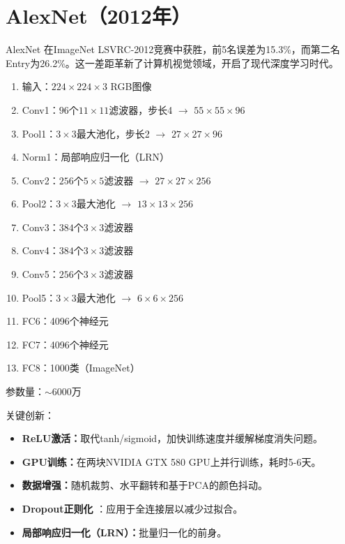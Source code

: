 \section{AlexNet（2012年）}

AlexNet \cite{krizhevsky2012imagenet}在ImageNet LSVRC-2012竞赛中获胜，前5名误差为15.3\%，而第二名 Entry为26.2\%。这一差距革新了计算机视觉领域，开启了现代深度学习时代。

\begin{architecture}[AlexNet架构]
\begin{enumerate}
    \item 输入：$224\times224\times3$ RGB图像
    \item Conv1：$96$个$11\times11$滤波器，步长4 $\rightarrow$ $55\times55\times96$
    \item Pool1：$3\times3$最大池化，步长2 $\rightarrow$ $27\times27\times96$
    \item Norm1：局部响应归一化（LRN）
    \item Conv2：$256$个$5\times5$滤波器 $\rightarrow$ $27\times27\times256$
    \item Pool2：$3\times3$最大池化 $\rightarrow$ $13\times13\times256$
    \item Conv3：$384$个$3\times3$滤波器
    \item Conv4：$384$个$3\times3$滤波器
    \item Conv5：$256$个$3\times3$滤波器
    \item Pool5：$3\times3$最大池化 $\rightarrow$ $6\times6\times256$
    \item FC6：4096个神经元
    \item FC7：4096个神经元
    \item FC8：1000类（ImageNet）
\end{enumerate}
\end{architecture}

参数量：$\sim$6000万

关键创新：
\begin{itemize}
    \item \textbf{ReLU激活：}取代tanh/sigmoid，加快训练速度并缓解梯度消失问题。
    \item \textbf{GPU训练：}在两块NVIDIA GTX 580 GPU上并行训练，耗时5-6天。
    \item \textbf{数据增强：}随机裁剪、水平翻转和基于PCA的颜色抖动。
    \item \textbf{Dropout正则化} \cite{srivastava2014dropout}：应用于全连接层以减少过拟合。
    \item \textbf{局部响应归一化（LRN）：}批量归一化的前身。
\end{itemize}

